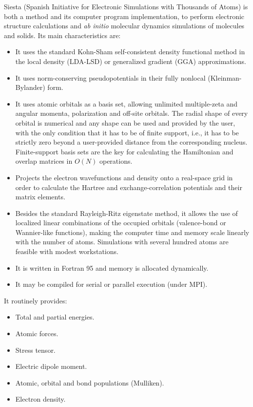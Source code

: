 \documentclass[11pt]{article}
\begin{document}
{\sc Siesta} (Spanish Initiative for
Electronic Simulations with
Thousands of Atoms) is both a method and its computer program implementation,
to perform electronic structure calculations and {\it ab initio} molecular
dynamics simulations of molecules and solids. Its main characteristics are:
\begin{itemize}
\item
It uses the standard Kohn-Sham self-consistent density functional
method in the local density (LDA-LSD) or generalized gradient (GGA)
approximations.
\item
It uses norm-conserving pseudopotentials in their fully nonlocal
(Kleinman-Bylander) form.
\item
It uses atomic orbitals as a basis set, allowing unlimited multiple-zeta
and angular momenta, polarization and off-site orbitals. The radial
shape of every orbital is numerical and any shape can be used and provided
by the user, with the only condition that it has to be of finite support,
i.e., it has to be strictly zero beyond a user-provided distance from the
corresponding nucleus.
Finite-support basis sets are the key for calculating the Hamiltonian
and overlap matrices in $O(N)$ operations.
\item
Projects the electron wavefunctions and density onto a real-space
grid in order to calculate the Hartree and exchange-correlation
potentials and their matrix elements.
\item
Besides the standard Rayleigh-Ritz eigenstate method, it allows
the use of localized linear combinations of the occupied orbitals
(valence-bond or Wannier-like functions), making the computer
time and memory scale linearly with the number of atoms.
Simulations with several hundred atoms are feasible with
modest workstations.
\item
It is written in Fortran 95 and memory is allocated dynamically.
\item
It may be compiled for serial or parallel execution (under MPI).

\end{itemize}

It routinely provides:
\begin{itemize}
\item Total and partial energies.
\item Atomic forces.
\item Stress tensor.
\item Electric dipole moment.
\item Atomic, orbital and bond populations (Mulliken).
\item Electron density.
\end{itemize}
\end{document}
